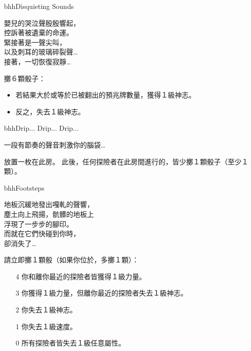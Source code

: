 \linebreak[0]%
\begin{EventCard}{bhh}{Disquieting Sounds}
  \begin{CardStory}
    嬰兒的哭泣聲殷殷響起，\\
    控訴著被遺棄的命運。\\
    緊接著是一聲尖叫，\\
    以及刺耳的玻璃碎裂聲…\\
    接著，一切恢復寂靜…
  \end{CardStory}
  擲６顆骰子：
  \begin{itemize}
    \item 若結果大於或等於已被翻出的預兆牌數量，獲得１級神志。
    \item 反之，失去１級神志。
  \end{itemize}
\end{EventCard}%
\linebreak[0]%
\begin{EventCard}{bhh}{Drip... Drip... Drip...}
  \begin{CardStory}
    一段有節奏的聲音刺激你的腦袋…
  \end{CardStory}
  放置一枚在此房。\smallbreak
  此後，任何探險者在此房間進行的，皆少擲１顆骰子（至少１顆）。\smallbreak
\end{EventCard}%
\linebreak[0]%
\begin{EventCard}{bhh}{Footsteps}
  \begin{CardStory}
    地板沉緩地發出嘎軋的聲響，\\
    塵土向上飛揚，骯髒的地板上\\
    浮現了一步步的腳印。\\
    而就在它們快碰到你時，\\
    卻消失了…
  \end{CardStory}
  請立即擲１顆骰（如果你位於，多擲１顆）：
  \begin{itemize}
    \item[4] 你和離你最近的探險者皆獲得１級力量。
    \item[3] 你獲得１級力量，但離你最近的探險者失去１級神志。
    \item[2] 你失去１級神志。
    \item[1] 你失去１級速度。
    \item[0] 所有探險者皆失去１級任意屬性。
  \end{itemize}
\end{EventCard}%
\linebreak[0]%

